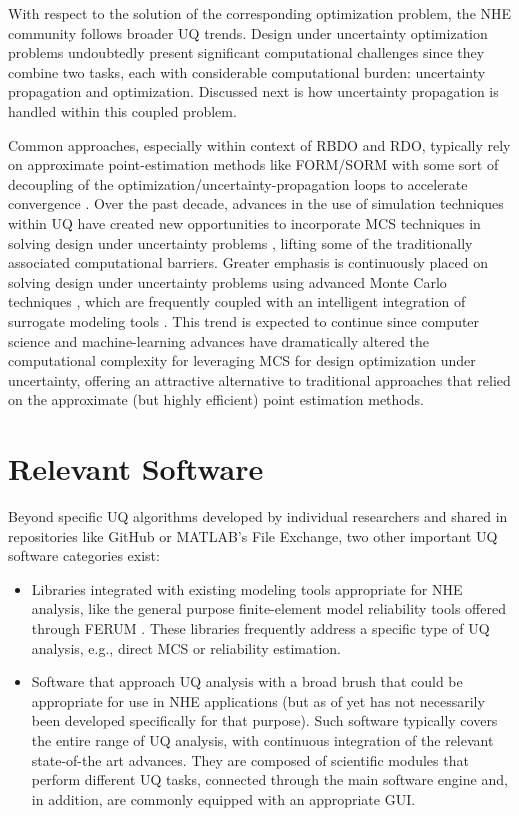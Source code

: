 With respect to the solution of the corresponding optimization problem, the NHE community follows broader UQ trends. Design under uncertainty optimization problems undoubtedly present significant computational challenges since they combine two tasks, each with considerable computational burden: uncertainty propagation and optimization. Discussed next is how uncertainty propagation is handled within this coupled problem.

Common approaches, especially within context of RBDO and RDO, typically rely on approximate point-estimation methods like FORM/SORM \citep{papadimitriou2018reliability} with some sort of decoupling of the optimization/uncertainty-propagation loops to accelerate convergence \citep{beyer2007robust}. Over the past decade, advances in the use of simulation techniques within UQ have created new opportunities to incorporate MCS techniques in solving design under uncertainty problems \citep{spall2003introduction, flint2016developing}, lifting some of the traditionally associated computational barriers. Greater emphasis is continuously placed on solving design under uncertainty problems using advanced Monte Carlo techniques \citep{medina2014adaptive}, which are frequently coupled with an intelligent integration of surrogate modeling tools \citep{dubourg2011reliabilitybased, bichon2013efficient, zhang2018adaptive}. This trend is expected to continue since computer science and machine-learning advances have dramatically altered the computational complexity for leveraging MCS for design optimization under uncertainty, offering an attractive alternative to traditional approaches that relied on the approximate (but highly efficient) point estimation methods.   

\section{Relevant Software}
\label{sec:uq_tools}

Beyond specific UQ algorithms developed by individual researchers and shared in repositories like GitHub or MATLAB's File Exchange, two other important UQ software categories exist:

\begin{itemize}
    \item Libraries integrated with existing modeling tools appropriate for NHE analysis, like the general purpose finite-element model reliability tools offered through FERUM \citep{bourinet2009review}. These libraries frequently address a specific type of UQ analysis, e.g., direct MCS or reliability estimation.

    \item Software that approach UQ analysis with a broad brush that could be appropriate for use in NHE applications (but as of yet has not necessarily been developed specifically for that purpose). Such software typically covers the entire range of UQ analysis, with continuous integration of the relevant state-of-the art advances. They are composed of scientific modules that perform different UQ tasks, connected through the main software engine and, in addition, are commonly equipped with an appropriate GUI. 
\end{itemize}
	
